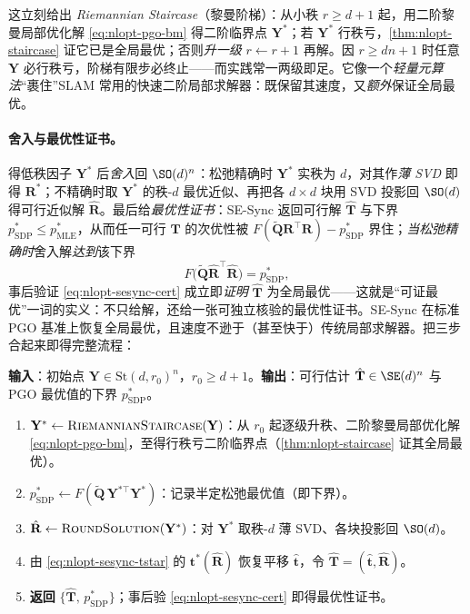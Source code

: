 \noindent 这立刻给出 \emph{Riemannian Staircase}（黎曼阶梯）：从小秩 $r\ge d{+}1$ 起，用二阶黎曼局部优化解 \cref{eq:nlopt-pgo-bm} 得二阶临界点 $\mathbf{Y}^*$；若 $\mathbf{Y}^*$ 行秩亏，\cref{thm:nlopt-staircase} 证它已是全局最优；否则\emph{升一级} $r\leftarrow r{+}1$ 再解。因 $r\ge dn{+}1$ 时任意 $\mathbf{Y}$ 必行秩亏，阶梯有限步必终止——而实践常一两级即足。它像一个\emph{轻量元算法}“裹住”SLAM 常用的快速二阶局部求解器：既保留其速度，又\emph{额外}保证全局最优。

\paragraph{舍入与最优性证书。}\cite{rosen2019sesync}
得低秩因子 $\mathbf{Y}^*$ 后\emph{舍入}回 $\SO(d)^n$：松弛精确时 $\mathbf{Y}^*$ 实秩为 $d$，对其作\emph{薄 SVD} 即得 $\mathbf{R}^*$；不精确时取 $\mathbf{Y}^*$ 的秩-$d$ 最优近似、再把各 $d\times d$ 块用 SVD 投影回 $\SO(d)$ 得可行近似解 $\hat{\mathbf{R}}$。最后给\emph{最优性证书}：SE-Sync 返回可行解 $\hat{\mathbf{T}}$ 与下界 $p^*_{\mathrm{SDP}}\le p^*_{\mathrm{MLE}}$，从而任一可行 $\mathbf{T}$ 的次优性被 $F(\tilde{\mathbf{Q}}\mathbf{R}^\top\mathbf{R})-p^*_{\mathrm{SDP}}$ 界住；\emph{当松弛精确时}舍入解\emph{达到}该下界
\begin{equation}
  F\!\big(\tilde{\mathbf{Q}}\hat{\mathbf{R}}^\top\hat{\mathbf{R}}\big)=p^*_{\mathrm{SDP}},
  \label{eq:nlopt-sesync-cert}
\end{equation}
事后验证 \cref{eq:nlopt-sesync-cert} 成立即\emph{证明} $\hat{\mathbf{T}}$ 为全局最优——这就是“可证最优”一词的实义：不只给解，还给一张可独立核验的最优性证书。SE-Sync 在标准 PGO 基准上恢复全局最优，且速度不逊于（甚至快于）传统局部求解器。把三步合起来即得完整流程：

\begin{algo}[SE-Sync]\label{alg:nlopt-sesync}
\textbf{输入}：初始点 $\mathbf{Y}\in\mathrm{St}(d,r_0)^n$，$r_0\ge d{+}1$。\textbf{输出}：可行估计 $\hat{\mathbf{T}}\in\SE(d)^n$ 与 PGO 最优值的下界 $p^*_{\mathrm{SDP}}$。
\begin{enumerate}
  \item $\mathbf{Y}^*\leftarrow\textsc{RiemannianStaircase}(\mathbf{Y})$：从 $r_0$ 起逐级升秩、二阶黎曼局部优化解 \cref{eq:nlopt-pgo-bm}，至得行秩亏二阶临界点（\cref{thm:nlopt-staircase} 证其全局最优）。
  \item $p^*_{\mathrm{SDP}}\leftarrow F(\tilde{\mathbf{Q}}\,\mathbf{Y}^{*\top}\mathbf{Y}^*)$：记录半定松弛最优值（即下界）。
  \item $\hat{\mathbf{R}}\leftarrow\textsc{RoundSolution}(\mathbf{Y}^*)$：对 $\mathbf{Y}^*$ 取秩-$d$ 薄 SVD、各块投影回 $\SO(d)$。
  \item 由 \cref{eq:nlopt-sesync-tstar} 的 $\mathbf{t}^*(\hat{\mathbf{R}})$ 恢复平移 $\hat{\mathbf{t}}$，令 $\hat{\mathbf{T}}=(\hat{\mathbf{t}},\hat{\mathbf{R}})$。
  \item \textbf{返回} $\{\hat{\mathbf{T}},\,p^*_{\mathrm{SDP}}\}$；事后验 \cref{eq:nlopt-sesync-cert} 即得最优性证书。
\end{enumerate}
\end{algo}

